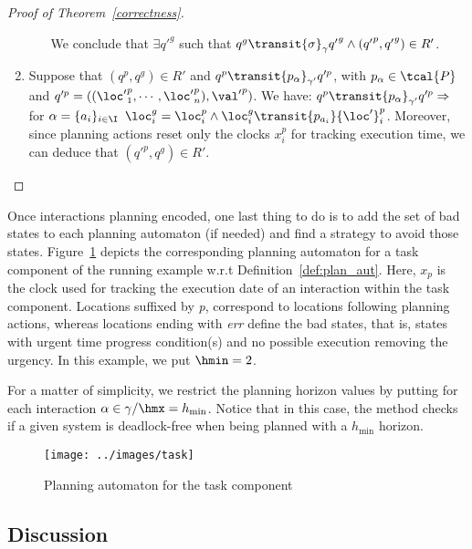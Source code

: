 \begin{proof}[Proof of Theorem~\ref{correctness}]
\begin{enumerate}
\begin{enumerate}
\begin{itemize}
         \end{itemize}
       We conclude that $\exists q'^g$ such that $q^g\transit{\sigma}_{\gamma}{q'}^g\wedge({q'}^
         p,{q'}^g)\in R'$.
  \end{enumerate}

\item Suppose that $(q^p,q^g)\in R'$ and $q^p\transit{p_{\alpha}}_{\gamma'}q'^{p}$, with 
  $p_{\alpha}\in\tcal{P}$ and $q'^p=(({\loc'}_1^p,\cdots,{\loc'}_n^p),{\val'}^p)$. We have:
      $q^p\transit{p_{\alpha}}_{\gamma'}q'^{p}\Rightarrow$ for $\alpha=\{a_i\}_{i\in\I}$
      $\loc_i^g=\loc_i^p\wedge\loc_i^g\transit{p_{a_i}}{\loc'}_i^p$. Moreover, since planning
      actions reset only the clocks $x_i^p$ for tracking execution time, we can deduce that
      $({q'}^p,q^g)\in R'$.
  \end{enumerate}

\end{proof}

Once interactions planning encoded, one last thing to do is to add the set of bad states to each
planning automaton (if needed) and find a strategy to avoid those states. 
Figure~\ref{fig:task} depicts the corresponding planning automaton for a task
component of the running example w.r.t Definition~\ref{def:plan_aut}. Here, $x_p$ is the clock
used for tracking the execution date of an interaction within the task component.
Locations suffixed by \emph{p}, correspond to locations following 
planning actions, whereas locations ending with \emph{err} define the bad states, that is,
states with urgent time progress condition(s) and no possible execution removing the urgency. In this example, we put $\hmin = 2$. 

For a matter of simplicity, we restrict the planning horizon values
by putting for each interaction $\alpha\in\gamma/ \hmx=h_{\min}$.
Notice that in this case,
the method checks if a given system is deadlock-free when being planned with
a $h_{\min}$ horizon.
\begin{figure}[h]
  \centering
  \texttt{[image: ../images/task]}
  \caption{Planning automaton for the task component}
  \label{fig:task}
\end{figure}

\subsection{Discussion}

